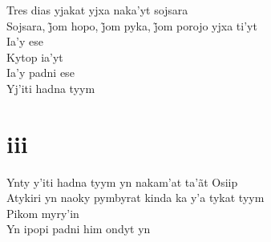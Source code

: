 \bigskip

\begin{linenumbers}
 
\noindent   Tres dias yjakat yjxa naka'yt sojsara\\
  Sojsara, j̃om hopo, j̃om pyka, j̃om porojo yjxa ti’yt\\
  Ia'y ese\\
  Kytop ia'yt\\
  Ia'y padni ese\\
  Yj'iti hadna tyym
 
 
\medskip
\section{iii}

  \noindent Ynty y'iti hadna tyym yn nakam'at ta'ãt Osiip\\
  Atykiri yn naoky pymbyrat kinda ka y'a tykat tyym\\
  Pikom myry'in\\
  Yn ipopi padni him ondyt yn
 
\end{linenumbers}

\bigskip

